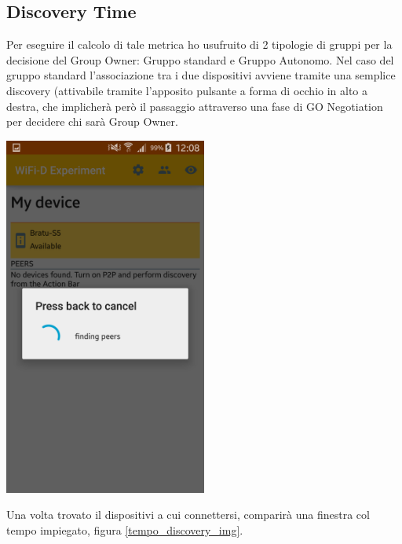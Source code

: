\subsection{Discovery Time}

Per eseguire il calcolo di tale metrica ho usufruito di 2 tipologie di gruppi per la decisione del Group Owner: Gruppo standard e Gruppo Autonomo.
Nel caso del gruppo standard l'associazione tra i due dispositivi avviene tramite una semplice discovery (attivabile tramite l'apposito pulsante a forma di occhio in alto a destra, che implicherà però il passaggio attraverso una fase di GO Negotiation per decidere chi sarà Group Owner.


\begin{center}
\includegraphics[width=0.5\textwidth]{imgs/Discovery.png}
\label{discovery_img}%
\end{center}

Una volta trovato il dispositivi a cui connettersi, comparirà una finestra col tempo impiegato, figura \ref{tempo_discovery_img}.

